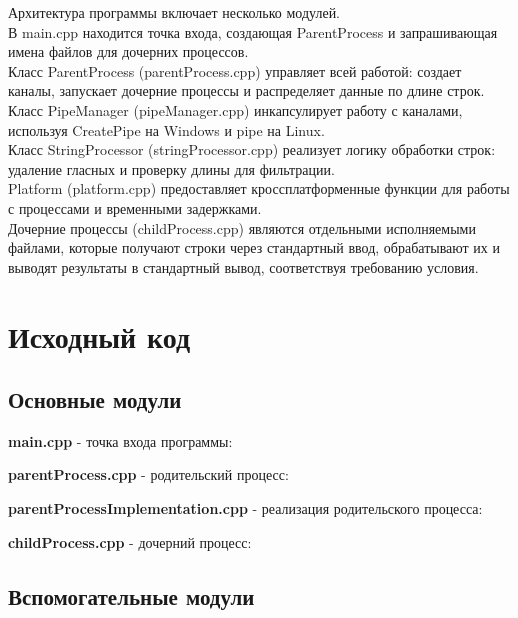 Архитектура программы включает несколько модулей. \\
В main.cpp находится точка входа, создающая ParentProcess и запрашивающая имена файлов для дочерних процессов. \\
Класс ParentProcess (parentProcess.cpp) управляет всей работой: создает каналы, запускает дочерние процессы и распределяет данные по длине строк. \\
Класс PipeManager (pipeManager.cpp) инкапсулирует работу с каналами, используя CreatePipe на Windows и pipe на Linux. \\
Класс StringProcessor (stringProcessor.cpp) реализует логику обработки строк: удаление гласных и проверку длины для фильтрации. \\
Platform (platform.cpp) предоставляет кроссплатформенные функции для работы с процессами и временными задержками.\\

Дочерние процессы (childProcess.cpp) являются отдельными исполняемыми файлами, которые получают строки через стандартный ввод, обрабатывают их и выводят результаты в стандартный вывод, соответствуя требованию условия.
\section{Исходный код}

\subsection{Основные модули}

\textbf{main.cpp} - точка входа программы:


\textbf{parentProcess.cpp} - родительский процесс:


\textbf{parentProcessImplementation.cpp} - реализация родительского процесса:


\textbf{childProcess.cpp} - дочерний процесс:


\subsection{Вспомогательные модули}

